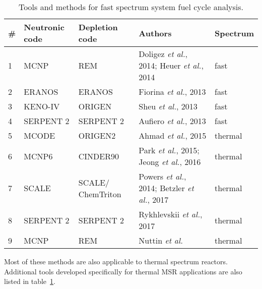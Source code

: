 \begin{table}[h!]
\centering
\caption{Tools and methods for fast spectrum system fuel cycle analysis.}
  \vspace{-0.8em}
\begin{tabular}{ |m{}|m{}|m{}|m{}|m{}|} 
\hline
\# & Neutronic code  & Depletion code    & \qquad Authors & Spectrum   \\[3pt]
\hline
1 & \gls{MCNP} \cite{noauthor_mcnp_2004}      & REM \cite{heuer_simulation_2010}  & Doligez \emph{et al.}, 2014; Heuer \emph{et al.}, 2014  \cite{doligez_coupled_2014,heuer_towards_2014}    & fast \\[5pt]
\hline
2 & ERANOS \cite{ruggieri_eranos_2006}      & ERANOS     & Fiorina \emph{et al.}, 2013 \cite{fiorina_investigation_2013}            & fast \\[5pt]
\hline
3 & KENO-IV \cite{goluoglu_monte_2011}     & ORIGEN \cite{gauld_isotopic_2011}     & Sheu \emph{et al.}, 2013 \cite{sheu_depletion_2013} & fast \\[5pt]
\hline
4 & SERPENT 2 \cite{leppanen_serpent_2015}   & SERPENT 2  & Aufiero \emph{et al.}, 2013 \cite{aufiero_extended_2013} & fast \\[5pt]
\hline
5 & MCODE \cite{xu_mcode_2008}      & ORIGEN2 \cite{croff_users_1980}      & Ahmad \emph{et al.}, 2015 \cite{ahmad_neutronics_2015}   & thermal  \\[5pt]
\hline
6 & \gls{MCNP}6     & CINDER90 \cite{goorley_mcnp6_2013}     & Park \emph{et al.}, 2015; Jeong \emph{et al.}, 2016 \cite{park_whole_2015, jeong_equilibrium_2016}& thermal\\[5pt]
\hline
7 & SCALE \cite{bowman_scale_2011}      & SCALE/ ChemTriton \cite{powers_new_2013}    & Powers \emph{et al.}, 2014; Betzler \emph{et al.}, 2017 \cite{powers_new_2013,powers_inventory_2014,betzler_molten_2017}& thermal\\[5pt]
\hline
8 & SERPENT 2      & SERPENT 2     & Rykhlevskii \emph{et al.}, 2017 \cite{rykhlevskii_online_2017} & thermal\\[5pt]
\hline
9 & \gls{MCNP}      & REM  & Nuttin \emph{et al.} \cite{nuttin_potential_2005}&thermal  \\[5pt]
\hline
\end{tabular}
  \vspace{-1.1em}
  \label{tab:fs_codes}
\end{table}

Most of these methods are also applicable to thermal spectrum reactors. Additional tools developed specifically for thermal \gls{MSR} applications are also listed in table~\ref{tab:fs_codes}.

